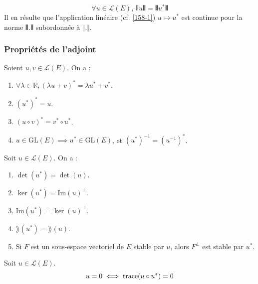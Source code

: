   \begin{proposition}
    \[ \forall u \in \mathcal{L}(E), \, \VERT u \VERT = \VERT u^* \VERT \]
    Il en résulte que l'application linéaire (cf. \cref{158-1}) $u \mapsto u^*$ est continue pour la norme $\VERT . \VERT$ subordonnée à $\Vert . \Vert$.
  \end{proposition}

  \subsubsection{Propriétés de l'adjoint}


  \begin{proposition}
    \label{158-1}
    Soient $u, v \in \mathcal{L}(E)$. On a :
    \begin{enumerate}[label={\bfseries(\roman*)}]
      \item $\forall \lambda \in \mathbb{R}, (\lambda u + v)^* = \lambda u^* + v^*$.
      \item $(u^*)^* = u$.
      \item $(u \circ v)^* = v^* \circ u^*$.
      \item $u \in \mathrm{GL}(E) \implies u^* \in \mathrm{GL}(E)$, et $(u^*)^{-1} = (u^{-1})^*$.
    \end{enumerate}
  \end{proposition}

  \begin{proposition}
    Soit $u \in \mathcal{L}(E)$. On a :
    \begin{enumerate}[label={\bfseries(\roman*)}]
      \item $\det(u^*) = \det(u)$.
      \item $\ker(u^*) = \mathrm{Im}(u)^\perp$.
      \item $\mathrm{Im}(u^*) = \ker(u)^\perp$.
      \item $\rang(u^*) = \rang(u)$.
      \item Si $F$ est un sous-espace vectoriel de $E$ stable par $u$, alors $F^\perp$ est stable par $u^*$.
    \end{enumerate}
  \end{proposition}


  \begin{proposition}
    Soit $u \in \mathcal{L}(E)$.
    \[ u = 0 \iff \operatorname{trace}(u \circ u^*) = 0 \]
  \end{proposition}

